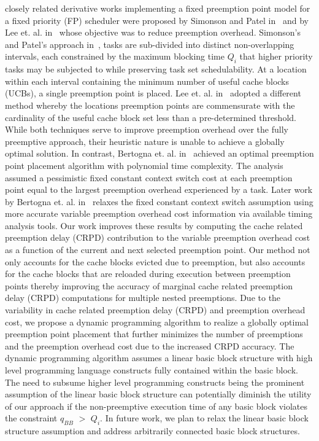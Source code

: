 closely related derivative works implementing a fixed preemption point model for a fixed priority (FP) scheduler were proposed by Simonson and Patel in~\cite{simonson:95} and by Lee et. al. in~\cite{lee:98} whose objective was to reduce preemption overhead.  Simonson’s and Patel’s approach in~\cite{simonson:95}, tasks are sub-divided into distinct non-overlapping intervals, each constrained by the maximum blocking time \begin{math}Q_{i}\end{math} that higher priority tasks may be subjected to while preserving task set schedulability.  At a location within each interval containing the minimum number of useful cache blocks (UCBs), a single preemption point is placed.  Lee et. al. in~\cite{lee:98} adopted a different method whereby the locations preemption points are commensurate with the cardinality of the useful cache block set less than a pre-determined threshold.   While both techniques serve to improve preemption overhead over the fully preemptive approach, their heuristic nature is unable to achieve a globally optimal solution.  In contrast, Bertogna et. al. in~\cite{bertogna:10} achieved an optimal preemption point placement algorithm with polynomial time complexity.  The analysis assumed a pessimistic fixed constant context switch cost at each preemption point equal to the largest preemption overhead experienced by a task.  Later work by Bertogna et. al. in~\cite{bertogna:11} relaxes the fixed constant context switch assumption using more accurate variable preemption overhead cost information via available timing analysis tools.  Our work improves these results by computing the cache related preemption delay (CRPD) contribution to the variable preemption overhead cost as a function of the current and next selected preemption point.  Our method not only accounts for the cache blocks evicted due to preemption, but also accounts for the cache blocks that are reloaded during execution between preemption points thereby improving the accuracy of marginal cache related preemption delay (CRPD) computations for multiple nested preemptions.  Due to the variability in cache related preemption delay (CRPD) and preemption overhead cost, we propose a dynamic programming algorithm to realize a globally optimal preemption point placement that further minimizes the number of preemptions and the preemption overhead cost due to the increased CRPD accuracy.  The dynamic programming algorithm assumes a linear basic block structure with high level programming language constructs fully contained within the basic block.  The need to subsume higher level programming constructs being the prominent assumption of the linear basic block structure can potentially diminish the utility of our approach if the non-preemptive execution time of any basic block violates the constraint \begin{math}q_{BB}\end{math} \begin{math}>\end{math} \begin{math}Q_{i}\end{math}. In future work, we plan to relax the linear basic block structure assumption and address arbitrarily connected basic block structures.

